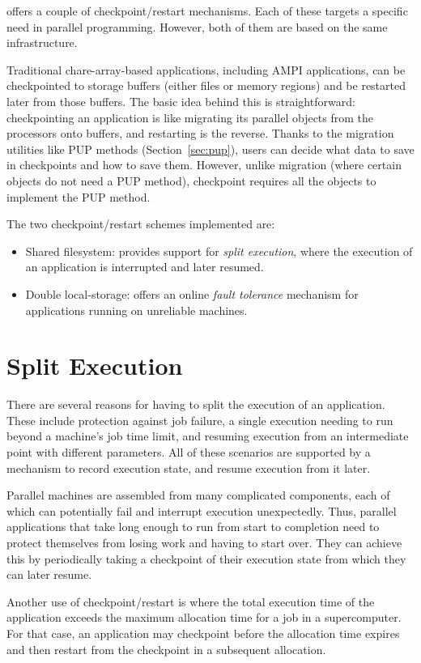 \charmpp{} offers a couple of checkpoint/restart mechanisms. Each
of these targets a specific need in parallel programming. However,
both of them are based on the same infrastructure.

Traditional chare-array-based \charmpp{} applications, including AMPI
applications, can be checkpointed to storage buffers (either files or
memory regions) and be restarted later from those buffers. The basic
idea behind this is straightforward: checkpointing an application is
like migrating its parallel objects from the processors onto buffers,
and restarting is the reverse. Thanks to the migration utilities like
PUP methods (Section~\ref{sec:pup}), users can decide what data to
save in checkpoints and how to save them. However, unlike migration
(where certain objects do not need a PUP method), checkpoint requires
all the objects to implement the PUP method.

The two checkpoint/restart schemes implemented are:
\begin{itemize}
\item Shared filesystem: provides support for \emph{split execution}, where the
execution of an application is interrupted and later resumed.
\item Double local-storage: offers an online \emph{fault
tolerance} mechanism for applications running on unreliable machines.
\end{itemize}

\section{Split Execution}

There are several reasons for having to split the execution of an
application. These include protection against job failure, a single
execution needing to run beyond a machine's job time limit, and
resuming execution from an intermediate point with different
parameters. All of these scenarios are supported by a mechanism to
record execution state, and resume execution from it later. 

Parallel machines are assembled from many complicated components, each
of which can potentially fail and interrupt execution
unexpectedly. Thus, parallel applications that take long enough to run
from start to completion need to protect themselves from losing work
and having to start over. They can achieve this by periodically taking
a checkpoint of their execution state from which they can later
resume.

Another use of checkpoint/restart is where the total execution
time of the application exceeds the maximum allocation time for a job
in a supercomputer. For that case, an application may checkpoint
before the allocation time expires and then restart from the
checkpoint in a subsequent allocation.


